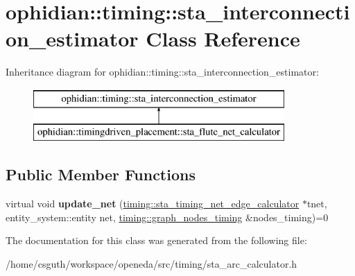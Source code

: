 \hypertarget{classophidian_1_1timing_1_1sta__interconnection__estimator}{\section{ophidian\-:\-:timing\-:\-:sta\-\_\-interconnection\-\_\-estimator Class Reference}
\label{classophidian_1_1timing_1_1sta__interconnection__estimator}
}
Inheritance diagram for ophidian\-:\-:timing\-:\-:sta\-\_\-interconnection\-\_\-estimator\-:\begin{figure}[H]
\begin{center}
\leavevmode
\includegraphics[height=2.000000cm]{classophidian_1_1timing_1_1sta__interconnection__estimator}
\end{center}
\end{figure}
\subsection*{Public Member Functions}
\begin{DoxyCompactItemize}
\item 
\hypertarget{classophidian_1_1timing_1_1sta__interconnection__estimator_a518eaf6cd4f65bdfcd559291537eff24}{virtual void {\bfseries update\-\_\-net} (\hyperlink{classophidian_1_1timing_1_1sta__timing__net__edge__calculator}{timing\-::sta\-\_\-timing\-\_\-net\-\_\-edge\-\_\-calculator} $\ast$tnet, entity\-\_\-system\-::entity net, \hyperlink{classophidian_1_1timing_1_1graph__nodes__timing}{timing\-::graph\-\_\-nodes\-\_\-timing} \&nodes\-\_\-timing)=0}\label{classophidian_1_1timing_1_1sta__interconnection__estimator_a518eaf6cd4f65bdfcd559291537eff24}

\end{DoxyCompactItemize}


The documentation for this class was generated from the following file\-:\begin{DoxyCompactItemize}
\item 
/home/csguth/workspace/openeda/src/timing/sta\-\_\-arc\-\_\-calculator.\-h\end{DoxyCompactItemize}
